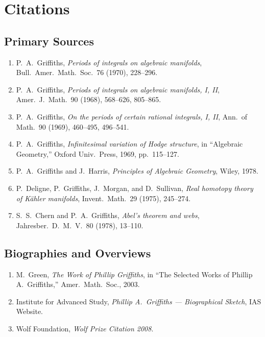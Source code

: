 \section{Citations}\subsection*{Primary Sources}
\begin{enumerate}
    \item P.\ A.\ Griffiths, \textit{Periods of integrals on algebraic manifolds}, Bull.\ Amer.\ Math.\ Soc.\ 76 (1970), 228--296.
    \item P.\ A.\ Griffiths, \textit{Periods of integrals on algebraic manifolds, I, II}, Amer.\ J.\ Math.\ 90 (1968), 568--626, 805--865.
    \item P.\ A.\ Griffiths, \textit{On the periods of certain rational integrals, I, II}, Ann.\ of Math.\ 90 (1969), 460--495, 496--541.
    \item P.\ A.\ Griffiths, \textit{Infinitesimal variation of Hodge structure}, in ``Algebraic Geometry,'' Oxford Univ.\ Press, 1969, pp.\ 115--127.
    \item P.\ A.\ Griffiths and J.\ Harris, \textit{Principles of Algebraic Geometry}, Wiley, 1978.
    \item P.\ Deligne, P.\ Griffiths, J.\ Morgan, and D.\ Sullivan, \textit{Real homotopy theory of K\"ahler manifolds}, Invent.\ Math.\ 29 (1975), 245--274.
    \item S.\ S.\ Chern and P.\ A.\ Griffiths, \textit{Abel's theorem and webs}, Jahresber.\ D.\ M.\ V.\ 80 (1978), 13--110.
\end{enumerate}

\subsection*{Biographies and Overviews}
\begin{enumerate}
    \item M.\ Green, \textit{The Work of Phillip Griffiths}, in ``The Selected Works of Phillip A.\ Griffiths,'' Amer.\ Math.\ Soc., 2003.
    \item Institute for Advanced Study, \textit{Phillip A.\ Griffiths --- Biographical Sketch}, IAS Website.
    \item Wolf Foundation, \textit{Wolf Prize Citation 2008}.
\end{enumerate}

